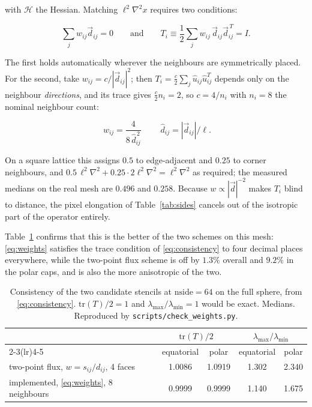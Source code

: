 \documentclass[11pt]{article}
\newcommand{\grid}{\ell}
\begin{document}
with $\mathcal{H}$ the Hessian. Matching $\grid^2\nabla^2 x$ requires two conditions:

\begin{equation}
\label{eq:consistency}
\sum_j w_{ij}\vec{d}_{ij} = 0
\qquad\text{and}\qquad
T_i \equiv \frac{1}{2}\sum_j w_{ij}\, \vec{d}_{ij}\vec{d}_{ij}^{\,T} = I .
\end{equation}

The first holds automatically wherever the neighbours are symmetrically placed. For the
second, take $w_{ij} = c/|\vec{d}_{ij}|^2$; then
$T_i = \tfrac{c}{2}\sum_j \hat{u}_{ij}\hat{u}_{ij}^{T}$ depends only on the neighbour
\emph{directions}, and its trace gives $\tfrac{c}{2} n_i = 2$, so $c = 4/n_i$ with
$n_i = 8$ the nominal neighbour count:

\begin{equation}
\label{eq:weights}
\boxed{\;w_{ij} = \frac{4}{8\,\hat{d}_{ij}^{\,2}}\;}
\qquad \hat{d}_{ij} = |\vec{d}_{ij}|/\grid .
\end{equation}

On a square lattice this assigns $0.5$ to edge-adjacent and $0.25$ to corner neighbours,
and $0.5\,\grid^2\nabla^2 + 0.25\cdot 2\grid^2\nabla^2 = \grid^2\nabla^2$ as required; the
measured medians on the real mesh are $0.496$ and $0.258$. Because $w \propto
|\vec{d}|^{-2}$ makes $T_i$ blind to distance, the pixel elongation of
Table~\ref{tab:sides} cancels out of the isotropic part of the operator entirely.

Table~\ref{tab:weights} confirms that this is the better of the two schemes on this mesh:
\eqref{eq:weights} satisfies the trace condition of \eqref{eq:consistency} to four
decimal places everywhere, while the two-point flux scheme is off by $1.3\%$ overall and
$9.2\%$ in the polar caps, and is also the more anisotropic of the two.

\begin{table}[htbp]
\centering
\caption{Consistency of the two candidate stencils at $\mathrm{nside}=64$ on the full
sphere, from \eqref{eq:consistency}. $\mathrm{tr}(T)/2 = 1$ and
$\lambda_{\max}/\lambda_{\min} = 1$ would be exact. Medians.
Reproduced by \texttt{scripts/check\_weights.py}.}
\label{tab:weights}
\begin{tabular}{lcccc}
\toprule
 & \multicolumn{2}{c}{$\mathrm{tr}(T)/2$} & \multicolumn{2}{c}{$\lambda_{\max}/\lambda_{\min}$} \\
\cmidrule(lr){2-3}\cmidrule(lr){4-5}
 & equatorial & polar & equatorial & polar \\
\midrule
two-point flux, $w = s_{ij}/d_{ij}$, 4 faces & 1.0086 & 1.0919 & 1.302 & 2.340 \\
implemented, \eqref{eq:weights}, 8 neighbours & 0.9999 & 0.9999 & 1.140 & 1.675 \\
\bottomrule
\end{tabular}
\end{table}
\end{document}
